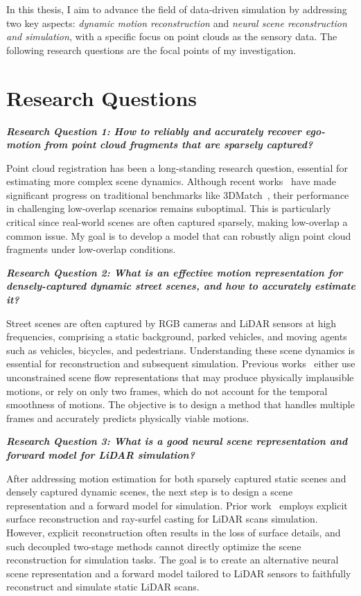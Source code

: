 In this thesis, I aim to advance the field of data-driven simulation by addressing two key aspects: \textit{dynamic motion reconstruction} and \textit{neural scene reconstruction and simulation}, with a specific focus on point clouds as the sensory data. The following research questions are the focal points of my investigation.

\section{Research Questions}
\noindent
\textbf{\textit{Research Question 1: How to reliably and accurately recover ego-motion from point cloud fragments that are sparsely captured?}}

Point cloud registration has been a long-standing research question, essential for estimating more complex scene dynamics. Although recent works~\cite{gojcic2018learned,Choy2019FCGF} have made significant progress on traditional benchmarks like 3DMatch~\cite{zeng20163dmatch}, their performance in challenging low-overlap scenarios remains suboptimal. This is particularly critical since real-world scenes are often captured sparsely, making low-overlap a common issue. My goal is to develop a model that can robustly align point cloud fragments under low-overlap conditions.

\noindent
\textbf{\textit{Research Question 2: What is an effective motion representation for densely-captured dynamic street scenes, and how to accurately estimate it?}}

Street scenes are often captured by RGB cameras and LiDAR sensors at high frequencies, comprising a static background, parked vehicles, and moving agents such as vehicles, bicycles, and pedestrians. Understanding these scene dynamics is essential for reconstruction and subsequent simulation. Previous works~\cite{li2020neural,gojcic2021weakly} either use unconstrained scene flow representations that may produce physically implausible motions, or rely on only two frames, which do not account for the temporal smoothness of motions. The objective is to design a method that handles multiple frames and accurately predicts physically viable motions.

\noindent
\textbf{\textit{Research Question 3: What is a good neural scene representation and forward model for LiDAR simulation?}}

After addressing motion estimation for both sparsely captured static scenes and densely captured dynamic scenes, the next step is to design a scene representation and a forward model for simulation. Prior work~\cite{manivasagam2020lidarsim} employs explicit surface reconstruction and ray-surfel casting for LiDAR scans simulation. However, explicit reconstruction often results in the loss of surface details, and such decoupled two-stage methods cannot directly optimize the scene reconstruction for simulation tasks. The goal is to create an alternative neural scene representation and a forward model tailored to LiDAR sensors to faithfully reconstruct and simulate static LiDAR scans.

